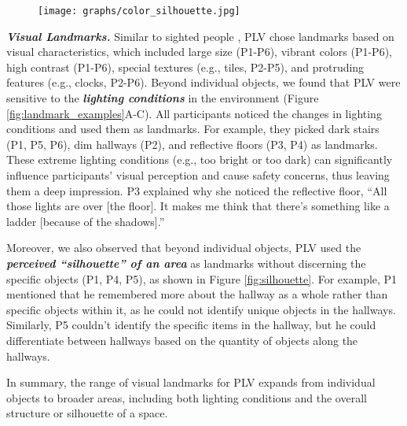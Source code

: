 \begin{figure*}[h]
    \centering
    \begin{subfigure}{0.99\textwidth}
        \centering
        \texttt{[image: graphs/color\_silhouette.jpg]}
    \end{subfigure}
    \caption{Perceived ``silhouette'' of an area: (A-B) Two similar hallways. (C-D) Blurred to simulate how the ``silhouette'' of an area looks to PLV, where similar hallways have different color blocks.} 
    \label{fig:silhouette}
\end{figure*}

\textbf{\textit{Visual Landmarks.}}
Similar to sighted people \cite{sorrows1999nature}, PLV chose landmarks based on visual characteristics, which included large size (P1-P6), vibrant colors (P1-P6), high contrast (P1-P6), special textures (e.g., tiles, P2-P5), and protruding features (e.g., clocks, P2-P6). Beyond individual objects, we found that PLV were sensitive to the \textbf{\textit{lighting conditions}} in the environment (Figure \ref{fig:landmark_examples}A-C). All participants noticed the changes in lighting conditions and used them as landmarks. For example, they picked dark stairs (P1, P5, P6), dim hallways (P2), and reflective floors (P3, P4) as landmarks. These extreme lighting conditions (e.g., too bright or too dark) can significantly influence participants' visual perception and cause safety concerns, thus leaving them a deep impression. P3 explained why she noticed the reflective floor, ``All those lights are over [the floor]. It makes me think that there's something like a ladder [because of the shadows].'' 

Moreover, we also observed that beyond individual objects, PLV used the \textbf{\textit{perceived ``silhouette'' of an area}} as landmarks without discerning the specific objects (P1, P4, P5), as shown in Figure \ref{fig:silhouette}. For example, P1 mentioned that he remembered more about the hallway as a whole rather than specific objects within it, as he could not identify unique objects in the hallways. Similarly, P5 couldn't identify the specific items in the hallway, but he could differentiate between hallways based on the quantity of objects along the hallways.

In summary, the range of visual landmarks for PLV expands from individual objects to broader areas, including both lighting conditions and the overall structure or silhouette of a space.


